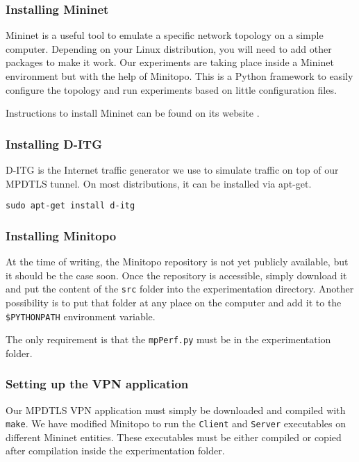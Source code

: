\subsubsection{Installing Mininet}

Mininet\cite{mininet} is a useful tool to emulate a specific network topology on a simple computer. Depending on your Linux distribution, you will need to add other packages to make it work. Our experiments are taking place inside a Mininet environment but with the help of Minitopo\cite{minitopo}. This is a Python framework to easily configure the topology and run experiments based on little configuration files.

Instructions to install Mininet can be found on its website \cite{mininet}.

\subsubsection{Installing D-ITG}

D-ITG \cite{ditg} is the Internet traffic generator we use to simulate traffic on top of our MPDTLS tunnel. On most distributions, it can be installed via apt-get.

\begin{lstlisting}
sudo apt-get install d-itg
\end{lstlisting}

\subsubsection{Installing Minitopo}

At the time of writing, the Minitopo repository\cite{minitopo} is not yet publicly available, but it should be the case soon. Once the repository is accessible, simply download it and put the content of the \texttt{src} folder into the experimentation directory. Another possibility is to put that folder at any place on the computer and add it to the \texttt{\$PYTHONPATH} environment variable.

The only requirement is that the \texttt{mpPerf.py} must be in the experimentation folder.

\subsubsection{Setting up the VPN application}

Our MPDTLS VPN application \cite{mpdtls-vpn} must simply be downloaded and compiled with \texttt{make}. We have modified Minitopo to run the \texttt{Client} and \texttt{Server} executables on different Mininet entities. These executables must be either compiled or copied after compilation inside the experimentation folder.

